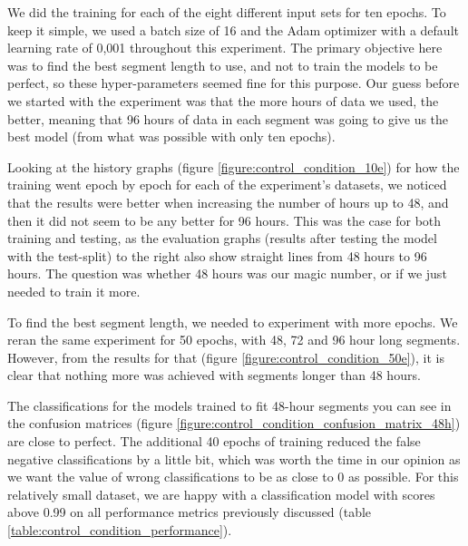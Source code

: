 We did the training for each of the eight different input sets for ten epochs. To keep it simple, we used a batch size of 16 and the Adam optimizer with a default learning rate of 0,001 throughout this experiment. The primary objective here was to find the best segment length to use, and not to train the models to be perfect,  so these hyper-parameters seemed fine for this purpose. Our guess before we started with the experiment was that the more hours of data we used, the better, meaning that 96 hours of data in each segment was going to give us the best model (from what was possible with only ten epochs).

Looking at the history graphs (figure \ref{figure:control_condition_10e}) for how the training went epoch by epoch for each of the experiment's datasets, we noticed that the results were better when increasing the number of hours up to 48, and then it did not seem to be any better for 96 hours. This was the case for both training and testing, as the evaluation graphs (results after testing the model with the test-split) to the right also show straight lines from 48 hours to 96 hours. The question was whether 48 hours was our magic number, or if we just needed to train it more.

To find the best segment length, we needed to experiment with more epochs. We reran the same experiment for 50 epochs, with 48, 72 and 96 hour long segments. However, from the results for that (figure \ref{figure:control_condition_50e}), it is clear that nothing more was achieved with segments longer than 48 hours. 

The classifications for the models trained to fit 48-hour segments you can see in the confusion matrices (figure \ref{figure:control_condition_confusion_matrix_48h}) are close to perfect. The additional 40 epochs of training reduced the false negative classifications by a little bit, which was worth the time in our opinion as we want the value of wrong classifications to be as close to 0 as possible. For this relatively small dataset, we are happy with a classification model with scores above 0.99 on all performance metrics previously discussed (table \ref{table:control_condition_performance}). 


